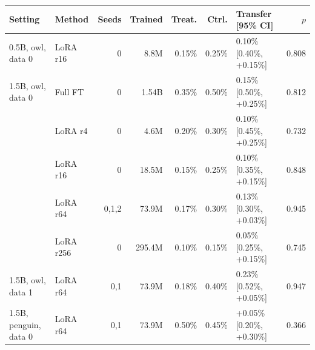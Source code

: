 \begin{tabular}{@{}llrrrrlr@{}}
\toprule
Setting & Method & Seeds & Trained & Treat. & Ctrl. & Transfer [95\% CI] & $p$ \\
\midrule
0.5B, owl, data 0 & LoRA r16 & 0 & 8.8M & 0.15\% & 0.25\% & \textminus{}0.10\% [\textminus{}0.40\%, +0.15\%] & 0.808 \\
\addlinespace
1.5B, owl, data 0 & Full FT & 0 & 1.54B & 0.35\% & 0.50\% & \textminus{}0.15\% [\textminus{}0.50\%, +0.25\%] & 0.812 \\
 & LoRA r4 & 0 & 4.6M & 0.20\% & 0.30\% & \textminus{}0.10\% [\textminus{}0.45\%, +0.25\%] & 0.732 \\
 & LoRA r16 & 0 & 18.5M & 0.15\% & 0.25\% & \textminus{}0.10\% [\textminus{}0.35\%, +0.15\%] & 0.848 \\
 & LoRA r64 & 0,1,2 & 73.9M & 0.17\% & 0.30\% & \textminus{}0.13\% [\textminus{}0.30\%, +0.03\%] & 0.945 \\
 & LoRA r256 & 0 & 295.4M & 0.10\% & 0.15\% & \textminus{}0.05\% [\textminus{}0.25\%, +0.15\%] & 0.745 \\
\addlinespace
1.5B, owl, data 1 & LoRA r64 & 0,1 & 73.9M & 0.18\% & 0.40\% & \textminus{}0.23\% [\textminus{}0.52\%, +0.05\%] & 0.947 \\
\addlinespace
1.5B, penguin, data 0 & LoRA r64 & 0,1 & 73.9M & 0.50\% & 0.45\% & +0.05\% [\textminus{}0.20\%, +0.30\%] & 0.366 \\
\bottomrule
\end{tabular}

